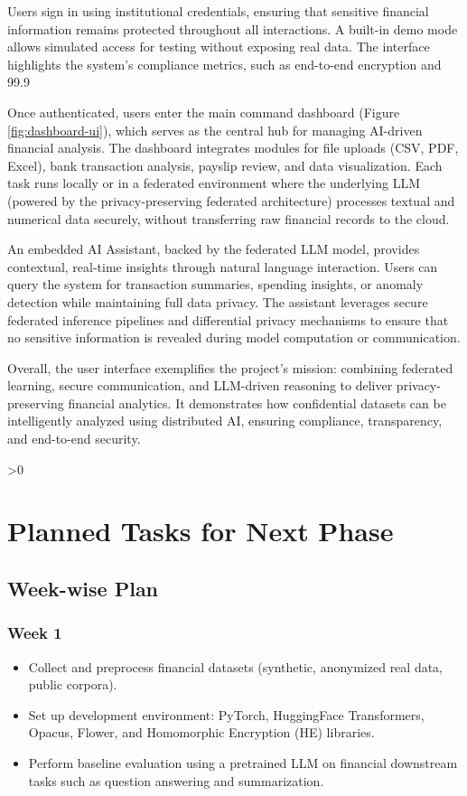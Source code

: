\documentclass[12pt,a4paper]{report}
\let\oldchapter\chapter
\renewcommand{\chapter}{\ifnum\value{chapter}>0 \clearpage\pagestyle{fancy}\fi\oldchapter}
\begin{document}
\begin{itemize}
    Users sign in using institutional credentials, ensuring that sensitive financial information remains protected throughout all interactions. A built-in demo mode allows simulated access for testing without exposing real data. The interface highlights the system’s compliance metrics, such as end-to-end encryption and 99.9%

Once authenticated, users enter the main command dashboard (Figure \ref{fig:dashboard-ui}), which serves as the central hub for managing AI-driven financial analysis. The dashboard integrates modules for file uploads (CSV, PDF, Excel), bank transaction analysis, payslip review, and data visualization. Each task runs locally or in a federated environment where the underlying LLM (powered by the privacy-preserving federated architecture) processes textual and numerical data securely, without transferring raw financial records to the cloud.

An embedded AI Assistant, backed by the federated LLM model, provides contextual, real-time insights through natural language interaction. Users can query the system for transaction summaries, spending insights, or anomaly detection while maintaining full data privacy. The assistant leverages secure federated inference pipelines and differential privacy mechanisms to ensure that no sensitive information is revealed during model computation or communication.

Overall, the user interface exemplifies the project’s mission: combining federated learning, secure communication, and LLM-driven reasoning to deliver privacy-preserving financial analytics. It demonstrates how confidential datasets can be intelligently analyzed using distributed AI, ensuring compliance, transparency, and end-to-end security.
\end{itemize}

\chapter{Planned Tasks for Next Phase}

\section*{Week-wise Plan}


\subsection*{Week 1}
\begin{itemize}
    \item Collect and preprocess financial datasets (synthetic, anonymized real data, public corpora).
    \item Set up development environment: PyTorch, HuggingFace Transformers, Opacus, Flower, and Homomorphic Encryption (HE) libraries.
    \item Perform baseline evaluation using a pretrained LLM on financial downstream tasks such as question answering and summarization.
\end{itemize}
\end{document}
